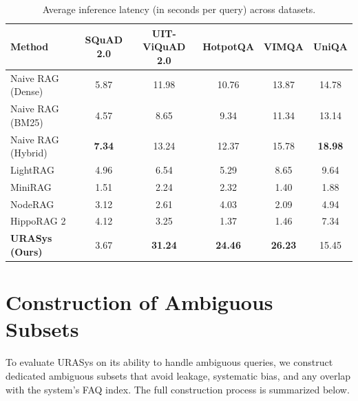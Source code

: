 \documentclass[11pt]{article}
\begin{document}
\begin{table}[t]
\centering
\caption{Average inference latency (in seconds per query) across datasets.}
\label{tab:latency}
\begin{tabular}{l|cc|cc|c}
\toprule
\textbf{Method} & \textbf{SQuAD 2.0} & \textbf{UIT-ViQuAD 2.0} & \textbf{HotpotQA} & \textbf{VIMQA} & \textbf{UniQA} \\
\midrule
Naive RAG (Dense)   & 5.87 & 11.98 & 10.76 & 13.87 & 14.78 \\
Naive RAG (BM25)    & 4.57 & 8.65  & 9.34  & 11.34 & 13.14 \\
Naive RAG (Hybrid)  & \textbf{7.34} & 13.24 & 12.37 & 15.78 & \textbf{18.98} \\
\midrule
LightRAG            & 4.96 & 6.54  & 5.29  & 8.65  & 9.64  \\
MiniRAG             & 1.51 & 2.24  & 2.32  & 1.40  & 1.88  \\
NodeRAG             & 3.12 & 2.61  & 4.03  & 2.09  & 4.94  \\
HippoRAG 2          & 4.12 & 3.25  & 1.37  & 1.46  & 7.34  \\
\midrule
\textbf{URASys (Ours)} 
                    & 3.67 & \textbf{31.24} & \textbf{24.46} & \textbf{26.23} & 15.45 \\
\bottomrule
\end{tabular}
\end{table}



\section{Construction of Ambiguous Subsets}


To evaluate URASys on its ability to handle ambiguous queries, we construct dedicated ambiguous subsets that avoid leakage, systematic bias, and any overlap with the system's FAQ index. The full construction process is summarized below.
\end{document}
